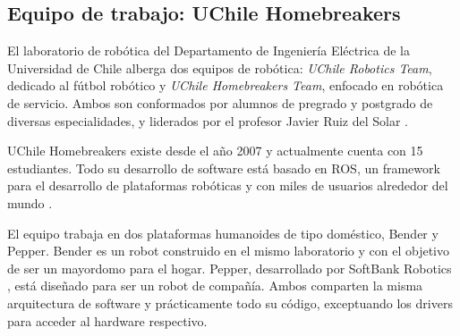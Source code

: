 \subsection{Equipo de trabajo: UChile Homebreakers}
El laboratorio de robótica del Departamento de Ingeniería Eléctrica de la Universidad de Chile alberga dos equipos de robótica: \textit{UChile Robotics Team}, dedicado al fútbol robótico y \textit{UChile Homebreakers Team}, enfocado en robótica de servicio. Ambos son conformados por alumnos de pregrado y postgrado de diversas especialidades, y liderados por el profesor Javier Ruiz del Solar \cite{uchile-robotics}.

UChile Homebreakers existe desde el año 2007 y actualmente cuenta con 15 estudiantes. Todo su desarrollo de software está basado en ROS, un framework para el desarrollo de plataformas robóticas y con miles de usuarios alrededor del mundo \cite{ROS:2009}.

El equipo trabaja en dos plataformas humanoides de tipo doméstico, Bender y Pepper. Bender es un robot construido en el mismo laboratorio y con el objetivo de ser un mayordomo para el hogar. Pepper, desarrollado por SoftBank Robotics \cite{softbank}, está diseñado para ser un robot de compañía. Ambos comparten la misma arquitectura de software y prácticamente todo su código, exceptuando los drivers para acceder al hardware respectivo.



%
%


